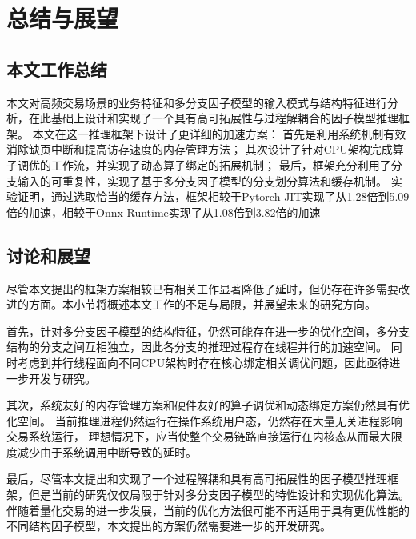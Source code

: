 \chapter{总结与展望}
\label{cha:experiment}

\section{本文工作总结}
本文对高频交易场景的业务特征和多分支因子模型的输入模式与结构特征进行分析，在此基础上设计和实现了一个具有高可拓展性与过程解耦合的因子模型推理框架。
本文在这一推理框架下设计了更详细的加速方案：
首先是利用系统机制有效消除缺页中断和提高访存速度的内存管理方法；
其次设计了针对CPU架构完成算子调优的工作流，并实现了动态算子绑定的拓展机制；
最后，框架充分利用了分支输入的可重复性，实现了基于多分支因子模型的分支划分算法和缓存机制。
实验证明，通过选取恰当的缓存方法，框架相较于Pytorch JIT实现了从1.28倍到5.09倍的加速，相较于Onnx Runtime实现了从1.08倍到3.82倍的加速


\section{讨论和展望}
尽管本文提出的框架方案相较已有相关工作显著降低了延时，但仍存在许多需要改进的方面。本小节将概述本文工作的不足与局限，并展望未来的研究方向。

首先，针对多分支因子模型的结构特征，仍然可能存在进一步的优化空间，多分支结构的分支之间互相独立，因此各分支的推理过程存在线程并行的加速空间。
同时考虑到并行线程面向不同CPU架构时存在核心绑定相关调优问题，因此亟待进一步开发与研究。

其次，系统友好的内存管理方案和硬件友好的算子调优和动态绑定方案仍然具有优化空间。
当前推理进程仍然运行在操作系统用户态，仍然存在大量无关进程影响交易系统运行，
理想情况下，应当使整个交易链路直接运行在内核态从而最大限度减少由于系统调用中断导致的延时。

最后，尽管本文提出和实现了一个过程解耦和具有高可拓展性的因子模型推理框架，但是当前的研究仅仅局限于针对多分支因子模型的特性设计和实现优化算法。
伴随着量化交易的进一步发展，当前的优化方法很可能不再适用于具有更优性能的不同结构因子模型，本文提出的方案仍然需要进一步的开发研究。
